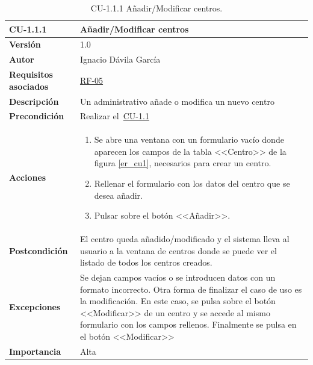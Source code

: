 \begin{table}[p]
\label{table:CU-1.1.1}
	\centering
	\begin{tabularx}{\linewidth}{ p{} p{} }
		\toprule
		\textbf{CU-1.1.1}    & \textbf{Añadir/Modificar centros}\\
		\toprule
		\textbf{Versión}              & 1.0    \\
		\textbf{Autor}                & Ignacio Dávila García \\
		\textbf{Requisitos asociados} & \hyperref[itm:RF5]{RF-05} \\
		\textbf{Descripción}          & Un administrativo añade o modifica un nuevo centro \\
		\textbf{Precondición}         & Realizar el~\hyperref[table:CU-1.1]{CU-1.1} \\
		\textbf{Acciones}             &
		\begin{enumerate}
			\def\labelenumi{\arabic{enumi}.}
			\tightlist
			\item Se abre una ventana con un formulario vacío donde aparecen los campos de la tabla <<Centro>> de la figura \ref{er_cu1}, necesarios para crear un centro.
			\item Rellenar el formulario con los datos del centro que se desea añadir.
			\item Pulsar sobre el botón <<Añadir>>.
		\end{enumerate}\\
		\textbf{Postcondición}        & El centro queda añadido/modificado y el sistema lleva al usuario a la ventana de centros donde se puede ver el listado de todos los centros creados. \\
		\textbf{Excepciones}          & Se dejan campos vacíos o se introducen datos con un formato incorrecto. Otra forma de finalizar el caso de uso es la modificación. En este caso, se pulsa sobre el botón <<Modificar>> de un centro y se accede al mismo formulario con los campos rellenos. Finalmente se pulsa en el botón <<Modificar>> \\
		\textbf{Importancia}          & Alta \\
		\bottomrule
	\end{tabularx}
	\caption{CU-1.1.1 Añadir/Modificar centros.}
\end{table}
\FloatBarrier

